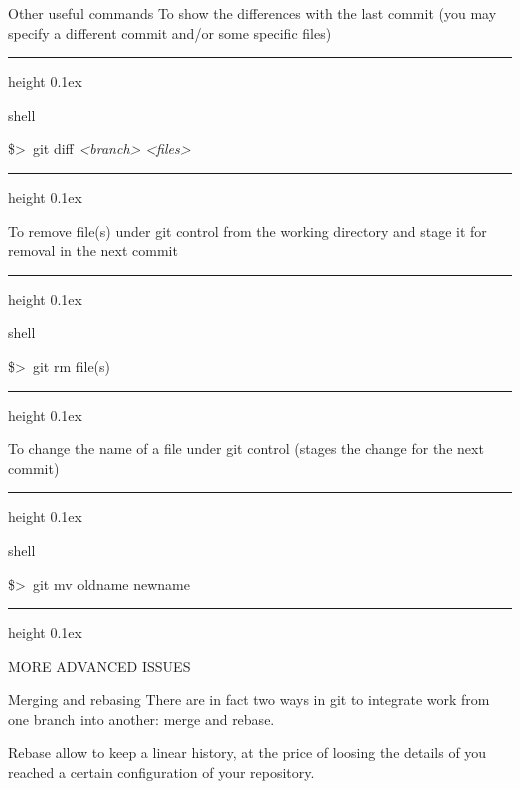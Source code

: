 \documentclass[hyperref={colorlinks}]{beamer}
\newenvironment{shell}{%
\footnotesize\flushleft\hrule height 0.1ex
\tt\begin{beamercolorbox}[sep=1ex,left]{shell}%
}{%
\end{beamercolorbox}
\hrule height 0.1ex
\endflushleft\par
}
\newcommand*{\psone}[1][ant]{\$>~}
\newcommand*{\var}[1]{{\it<#1>}}
\begin{document}
\begin{frame}{Other useful commands}
To show the differences with the last commit (you may specify a different commit and/or some specific files)
\begin{shell}
\psone git diff \var{branch} \var{files}
\end{shell}

To remove file(s) under git control from the working directory and stage it for removal in the next commit
\begin{shell}
\psone git rm file(s)
\end{shell}

To change the name of a file under git control (stages the change for the next commit)
\begin{shell}
\psone git mv oldname newname
\end{shell}
\end{frame}

\begin{frame}
  \Huge
  MORE ADVANCED ISSUES
\end{frame}

\begin{frame}{Merging and rebasing}
There are in fact two ways in git to integrate work from one branch into another: merge and rebase.

Rebase allow to keep a linear history, at the price of loosing the details of you reached a certain
configuration of your repository.
\end{frame}
\end{document}
